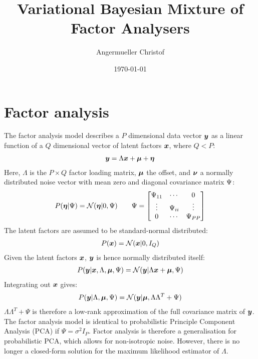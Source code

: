 \documentclass[a4paper]{article}
\author{Angermueller Christof}
\date{\today}
\title{Variational Bayesian Mixture of Factor Analysers}
\begin{document}
\maketitle
\tableofcontents

\section{Factor analysis}
The factor analysis model describes a $P$ dimensional data vector $\boldsymbol{y}$ as a linear function of a $Q$ dimensional vector of latent factors $\boldsymbol{x}$, where $Q<P$:
\begin{align}
  \boldsymbol{y}=\Lambda\boldsymbol{x}+\boldsymbol{\mu}+\boldsymbol{\eta}
\end{align}
Here, $\Lambda$ is the $P\times Q$ factor loading matrix, $\boldsymbol{\mu}$ the offset, and $\boldsymbol{\nu}$ a normally distributed noise vector with mean zero and diagonal covariance matrix $\Psi$:
\begin{align}
  P(\boldsymbol{\eta}|\Psi)=\mathcal{N}(\boldsymbol{\eta}|0,\Psi) \qquad
  \Psi=\begin{bmatrix}
    \Psi_{11} & \cdots & 0 \\
    \vdots & \Psi_{ii} & \vdots \\
    0 & \cdots & \Psi_{PP}
  \end{bmatrix}
\end{align}
The latent factors are assumed to be standard-normal distributed:
\begin{align}
  P(\boldsymbol{x})=\mathcal{N}(\boldsymbol{x}|0,I_Q)
\end{align}
Given the latent factors $\boldsymbol{x}$, $\boldsymbol{y}$ is hence normally distributed itself:
\begin{align}
  P(\boldsymbol{y}|\boldsymbol{x},\Lambda,\boldsymbol{\mu},\Psi)=\mathcal{N}(\boldsymbol{y}|\Lambda\boldsymbol{x}+\boldsymbol{\mu},\Psi)
\end{align}
Integrating out $\boldsymbol{x}$ gives:
\begin{align}
  P(\boldsymbol{y}|\Lambda,\boldsymbol{\mu},\Psi)=\mathcal{N}(\boldsymbol{y}|\boldsymbol{\mu}, \Lambda\Lambda^T+\Psi)
\end{align}
$\Lambda\Lambda^T+\Psi$ is therefore a low-rank approximation of the full covariance matrix of $\boldsymbol{y}$. The factor analysis model is identical to probabilistic Principle Component Analysis (PCA) if $\Psi=\sigma^2 I_P$. Factor analysis is therefore a generalisation for probabilistic PCA, which allows for non-isotropic noise. However, there is no longer a closed-form solution for the maximum likelihood estimator of $\Lambda$.
\end{document}
